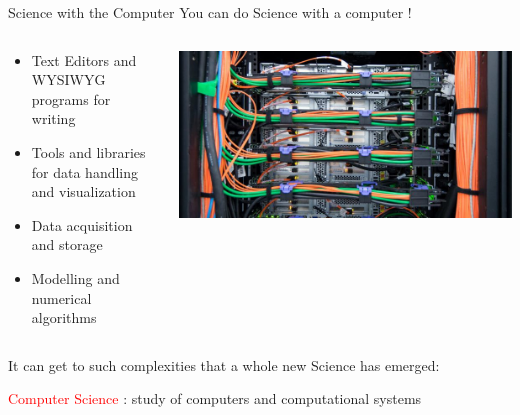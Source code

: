 \documentclass[unknownkeysallowed, 10pt, a4 paper, handout]{beamer}
\begin{document}
\begin{frame}[label=outline]{Science with the Computer}
  You can do Science with a computer !
  \begin{columns}[T]
    \begin{column}{.53\textwidth}
      \begin{itemize}
        \item Text Editors and WYSIWYG programs for writing
        \item Tools and libraries for data handling and visualization
        \item Data acquisition and storage
        \item Modelling and numerical algorithms
      \end{itemize}
    \end{column}
    \hfill
    \begin{column}{.45\textwidth}
      \vspace{15pt}
      \includegraphics[scale=0.2]{pics/20140924103021_DSC_6759_MHPC.jpg}
    \end{column}
  \end{columns}
  It can get to such complexities that a whole new Science has emerged:
  \begin{center}
    \textcolor{red}{Computer Science} : 
             study of computers and computational systems
  \end{center}
\end{frame}
\end{document}
